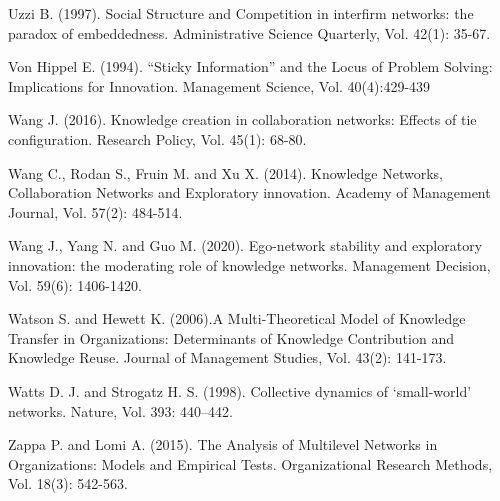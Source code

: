 \documentclass{article}
\begin{document}
\begin{hangparas}{.25in}{1}
Uzzi B. (1997). Social Structure and Competition in interfirm networks: the paradox of embeddedness. Administrative Science Quarterly, Vol. 42(1): 35-67.

Von Hippel E. (1994). “Sticky Information” and the Locus of Problem Solving: Implications for Innovation. Management Science, Vol. 40(4):429-439 

Wang J. (2016). Knowledge creation in collaboration networks: Effects of tie configuration. Research Policy, Vol. 45(1): 68-80.

Wang C., Rodan S., Fruin M. and Xu X. (2014). Knowledge Networks, Collaboration Networks and Exploratory innovation. Academy of Management Journal, Vol. 57(2): 484-514.

Wang J., Yang N. and Guo M. (2020). Ego-network stability and exploratory innovation: the moderating role of knowledge networks. Management Decision, Vol. 59(6): 1406-1420.

Watson S. and Hewett K. (2006).A Multi-Theoretical Model of Knowledge Transfer in Organizations: Determinants of Knowledge Contribution and Knowledge Reuse. Journal of Management Studies, Vol. 43(2): 141-173.

Watts D. J. and Strogatz H. S. (1998). Collective dynamics of ‘small-world’ networks. Nature, Vol. 393: 440–442.

Zappa P. and Lomi A. (2015). The Analysis of Multilevel Networks in Organizations: Models and Empirical Tests. Organizational Research Methods, Vol. 18(3): 542-563.

\end{hangparas}
\end{document}
